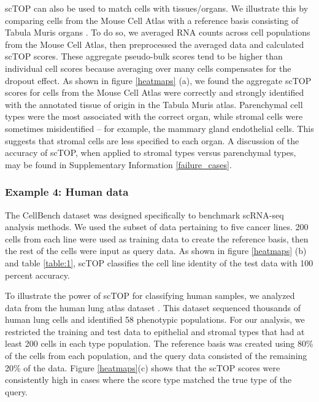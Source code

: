 \documentclass[vruler,JEB]{COB}%
\begin{document}
scTOP can also be used to match cells with tissues/organs. We illustrate this by comparing cells from the Mouse Cell Atlas with a reference basis consisting of Tabula Muris organs \citep{schaum_single-cell_2018}. To do so, we averaged RNA counts across cell populations from the Mouse Cell Atlas, then preprocessed the averaged data and calculated scTOP scores. These aggregate pseudo-bulk scores tend to be higher than individual cell scores because averaging over many cells compensates for the dropout effect. As shown in figure \ref{heatmaps} (a), we found the aggregate scTOP scores for cells from the Mouse Cell Atlas were correctly and strongly identified with the annotated tissue of origin in the Tabula Muris atlas. Parenchymal cell types were the most associated with the correct organ, while stromal cells were sometimes misidentified -- for example, the mammary gland endothelial cells. This suggests that stromal cells are less specified to each organ. A discussion of the accuracy of scTOP, when applied to stromal types versus parenchymal types, may be found in Supplementary Information \ref{failure_cases}.

\subsubsection{Example 4:  Human data}

The CellBench dataset \citep{tian_benchmarking_2019} was designed specifically to benchmark scRNA-seq analysis methods. We used the subset of data pertaining to five cancer lines. 200 cells from each line were used as training data to create the reference basis, then the rest of the cells were input as query data. As shown in figure \ref{heatmaps} (b) and table \ref{table:1}, scTOP classifies the cell line identity of the test data with 100 percent accuracy.

To illustrate the power of scTOP for classifying human samples, we analyzed data from the human lung atlas dataset \citep{travaglini_molecular_2020}. This dataset sequenced thousands of human lung cells and identified 58 phenotypic populations. For our analysis, we restricted the training and test data to epithelial and stromal types that had at least 200 cells in each type population. The reference basis was created using 80\% of the cells from each population, and the query data consisted of the remaining 20\% of the data. Figure \ref{heatmaps}(c) shows that the scTOP scores were consistently high in cases where the score type matched the true type of the query.
\end{document}
